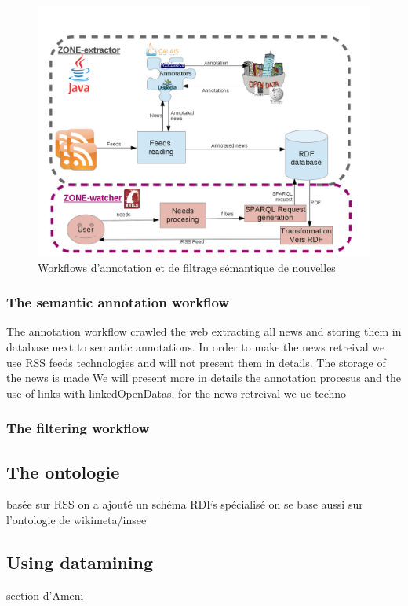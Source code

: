\documentclass{llncs}
\begin{document}
\begin{figure}[htb!]
	\begin{centering}
	\includegraphics[width=1\textwidth]{diagramArchi.png}
	\caption{Workflows d'annotation et de filtrage sémantique de nouvelles}
	\label{fig:WF}
	\end{centering}
\end{figure}

\subsubsection{The semantic annotation workflow}
The annotation workflow crawled the web extracting all news and storing them in database next to semantic annotations.
In order to make the news retreival we use RSS feeds technologies and will not present them in details. The storage of the news is made 
We will present more in details the annotation procesus and the use of links with linkedOpenDatas, for the news retreival we ue techno

\subsubsection{The filtering workflow}

%
\subsection{The ontologie}
%
basée sur RSS
on a ajouté un schéma RDFs spécialisé
on se base aussi sur l'ontologie de wikimeta/insee
%

%
\subsection{Using datamining}
section d'Ameni
\end{document}
